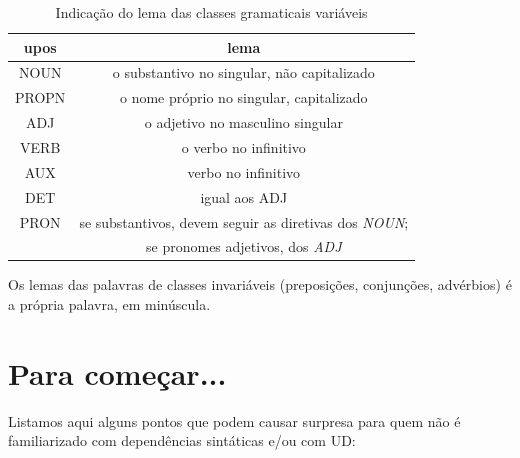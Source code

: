 \documentclass[output=paper,colorlinks,citecolor=brown]{langscibook}
\begin{document}
	\begin{table}[]
	    \centering
	    \begin{tabular}{ c | c }
	    \textbf{upos} & \textbf{lema} \\
          \hline
	    NOUN & o substantivo no singular, não capitalizado \\
	    \hline
	    PROPN & o nome próprio no singular, capitalizado \\
	    \hline
	    ADJ & o adjetivo no masculino singular \\
	    \hline
           VERB & o verbo no infinitivo \\
	    \hline
	    AUX & verbo no infinitivo \\
	    \hline
	    DET & igual aos ADJ \\
	    \hline
	    PRON & se substantivos, devem seguir as diretivas dos \emph{NOUN};\\ & se pronomes adjetivos, dos \emph{ADJ} \\
	    \end{tabular}
	    \caption{Indicação do lema das classes gramaticais variáveis}
	    \label{tab:lemma}
	\end{table}{}

	Os lemas das palavras de classes invariáveis (preposições, conjunções, advérbios) é a própria palavra, em minúscula.


\chapter{Para começar...}\label{sec:paracomecar}

	Listamos aqui alguns pontos que podem causar surpresa para quem não é familiarizado com dependências sintáticas e/ou com UD:
	
\end{document}
